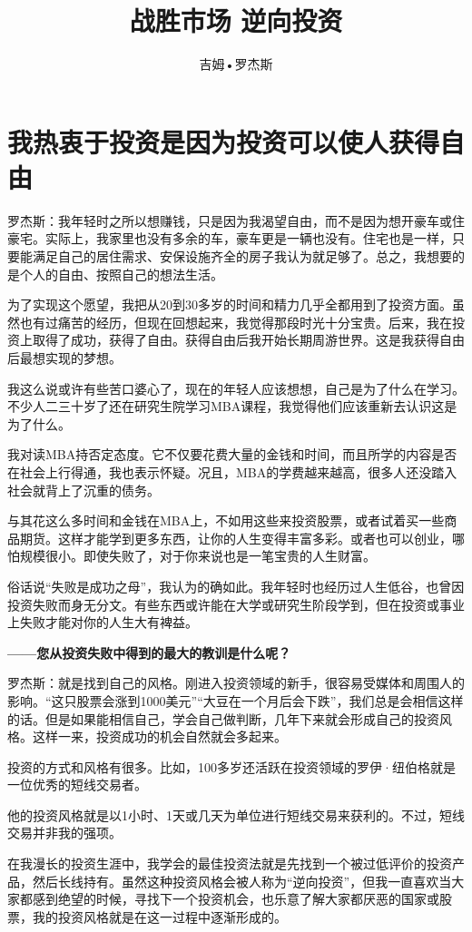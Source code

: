 \documentclass[UTF8,a4paper,zihao=-4,fontset = ubuntu]{ctexart} %
\title{战胜市场 逆向投资} %
\author{吉姆•罗杰斯}
\begin{document}
\section{我热衷于投资是因为投资可以使人获得自由}

罗杰斯：我年轻时之所以想赚钱，只是因为我渴望自由，而不是因为想开豪车或住豪宅。实际上，我家里也没有多余的车，豪车更是一辆也没有。住宅也是一样，只要能满足自己的居住需求、安保设施齐全的房子我认为就足够了。总之，我想要的是个人的自由、按照自己的想法生活。

为了实现这个愿望，我把从20到30多岁的时间和精力几乎全都用到了投资方面。虽然也有过痛苦的经历，但现在回想起来，我觉得那段时光十分宝贵。后来，我在投资上取得了成功，获得了自由。获得自由后我开始长期周游世界。这是我获得自由后最想实现的梦想。

我这么说或许有些苦口婆心了，现在的年轻人应该想想，自己是为了什么在学习。不少人二三十岁了还在研究生院学习MBA课程，我觉得他们应该重新去认识这是为了什么。

我对读MBA持否定态度。它不仅要花费大量的金钱和时间，而且所学的内容是否在社会上行得通，我也表示怀疑。况且，MBA的学费越来越高，很多人还没踏入社会就背上了沉重的债务。

与其花这么多时间和金钱在MBA上，不如用这些来投资股票，或者试着买一些商品期货。这样才能学到更多东西，让你的人生变得丰富多彩。或者也可以创业，哪怕规模很小。即使失败了，对于你来说也是一笔宝贵的人生财富。

俗话说“失败是成功之母”，我认为的确如此。我年轻时也经历过人生低谷，也曾因投资失败而身无分文。有些东西或许能在大学或研究生阶段学到，但在投资或事业上失败才能对你的人生大有裨益。

\textbf{——您从投资失败中得到的最大的教训是什么呢？}

罗杰斯：就是找到自己的风格。刚进入投资领域的新手，很容易受媒体和周围人的影响。“这只股票会涨到1000美元”“大豆在一个月后会下跌”，我们总是会相信这样的话。但是如果能相信自己，学会自己做判断，几年下来就会形成自己的投资风格。这样一来，投资成功的机会自然就会多起来。

投资的方式和风格有很多。比如，100多岁还活跃在投资领域的罗伊·纽伯格就是一位优秀的短线交易者。

他的投资风格就是以1小时、1天或几天为单位进行短线交易来获利的。不过，短线交易并非我的强项。

在我漫长的投资生涯中，我学会的最佳投资法就是先找到一个被过低评价的投资产品，然后长线持有。虽然这种投资风格会被人称为“逆向投资”，但我一直喜欢当大家都感到绝望的时候，寻找下一个投资机会，也乐意了解大家都厌恶的国家或股票，我的投资风格就是在这一过程中逐渐形成的。
\end{document}
